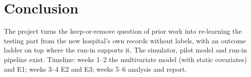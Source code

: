\documentclass{article}
\theoremstyle{plain}
\theoremstyle{definition}
\theoremstyle{remark}
\begin{document}
\section{Conclusion}

The project turns the keep-or-remove question of prior work into re-learning the testing part from the new hospital's own records without labels, with an outcome ladder on top where the run-in supports it. The simulator, pilot model and run-in pipeline exist. Timeline: weeks 1--2 the multivariate model (with static covariates) and E1; weeks 3--4 E2 and E3; weeks 5--6 analysis and report.




\end{document}
